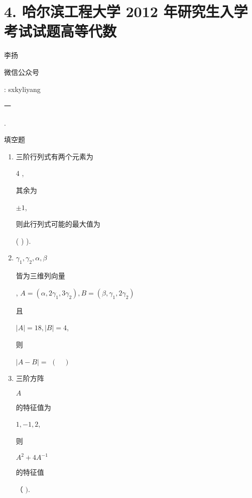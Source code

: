 \documentclass[10pt]{article}
\begin{document}
\section{4. 哈尔滨工程大学 2012 年研究生入学考试试题高等代数}
\begin{CJK}{UTF8}{mj}李扬\end{CJK}

\begin{CJK}{UTF8}{mj}微信公众号\end{CJK}: sxkyliyang

\begin{CJK}{UTF8}{mj}一\end{CJK}. \begin{CJK}{UTF8}{mj}填空题\end{CJK}

\begin{enumerate}
  \item \begin{CJK}{UTF8}{mj}三阶行列式有两个元素为\end{CJK} 4 , \begin{CJK}{UTF8}{mj}其余为\end{CJK} $\pm 1$, \begin{CJK}{UTF8}{mj}则此行列式可能的最大值为\end{CJK} ( ) ).

  \item $\gamma_{1}, \gamma_{2}, \alpha, \beta$ \begin{CJK}{UTF8}{mj}皆为三维列向量\end{CJK}, $A=\left(\alpha, 2 \gamma_{1}, 3 \gamma_{2}\right), B=\left(\beta, \gamma_{1}, 2 \gamma_{2}\right)$ \begin{CJK}{UTF8}{mj}且\end{CJK} $|A|=18,|B|=4$, \begin{CJK}{UTF8}{mj}则\end{CJK} $|A-B|=$ $(\quad)$

  \item \begin{CJK}{UTF8}{mj}三阶方阵\end{CJK} $A$ \begin{CJK}{UTF8}{mj}的特征值为\end{CJK} $1,-1,2$, \begin{CJK}{UTF8}{mj}则\end{CJK} $A^{2}+4 A^{-1}$ \begin{CJK}{UTF8}{mj}的特征值\end{CJK}（ $)$.


\end{enumerate}
\end{document}
